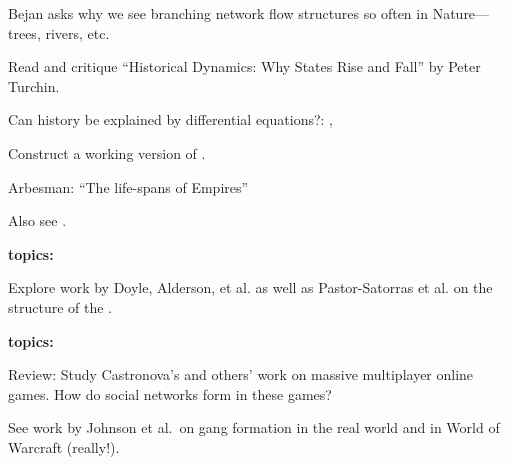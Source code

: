       Bejan asks why we see branching network flow structures so often in
      Nature---trees, rivers, etc.
    
  

  
    
    
      Read and critique ``Historical Dynamics:
      Why States Rise and Fall'' by Peter Turchin.\cite{turchin2003a}
    
      Can history be explained by differential equations?:
      ,
    
      Construct a working version of .
    
    
      Arbesman: ``The life-spans of Empires''\cite{arbesman2011a}
    
      Also see 
      .
    
  


  \textbf{topics:}

  
  
  
    Explore work by Doyle, Alderson, et al. 
    as well as Pastor-Satorras et al. on the structure 
    of the .
  
  






  \textbf{topics:}

  
  
  
    Review: Study Castronova's and others'
    work on massive multiplayer online games.  
    How do social networks
    form in these games?\cite{castronova2005a}
  
    See work by Johnson et al.\ on gang formation
    in the real world and in World of Warcraft (really!).
  
  





